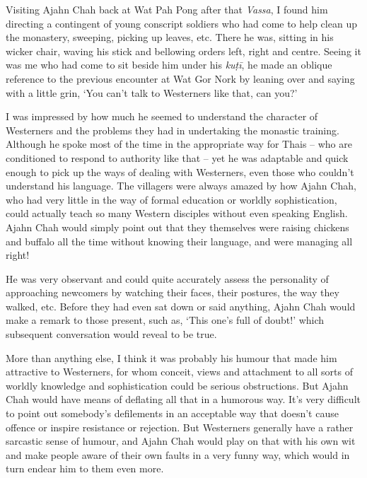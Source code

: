 Visiting Ajahn Chah back at Wat Pah Pong after that \emph{Vassa}, I
found him directing a contingent of young conscript soldiers who had
come to help clean up the monastery, sweeping, picking up leaves, etc.
There he was, sitting in his wicker chair, waving his stick and
bellowing orders left, right and centre. Seeing it was me who had come
to sit beside him under his \emph{kuṭī}, he made an oblique reference to
the previous encounter at Wat Gor Nork by leaning over and saying with a
little grin, `You can't talk to Westerners like that, can you?'

I was impressed by how much he seemed to understand the character of
Westerners and the problems they had in undertaking the monastic
training. Although he spoke most of the time in the appropriate way for
Thais -- who are conditioned to respond to authority like that -- yet he
was adaptable and quick enough to pick up the ways of dealing with
Westerners, even those who couldn't understand his language. The
villagers were always amazed by how Ajahn Chah, who had very little in
the way of formal education or worldly sophistication, could actually
teach so many Western disciples without even speaking English. Ajahn
Chah would simply point out that they themselves were raising chickens
and buffalo all the time without knowing their language, and were
managing all right!

He was very observant and could quite accurately assess the personality
of approaching newcomers by watching their faces, their postures, the
way they walked, etc. Before they had even sat down or said anything,
Ajahn Chah would make a remark to those present, such as, `This one's
full of doubt!' which subsequent conversation would reveal to be true.

More than anything else, I think it was probably his humour that made
him attractive to Westerners, for whom conceit, views and attachment to
all sorts of worldly knowledge and sophistication could be serious
obstructions. But Ajahn Chah would have means of deflating all that in a
humorous way. It's very difficult to point out somebody's defilements in
an acceptable way that doesn't cause offence or inspire resistance or
rejection. But Westerners generally have a rather sarcastic sense of
humour, and Ajahn Chah would play on that with his own wit and make
people aware of their own faults in a very funny way, which would in
turn endear him to them even more.

